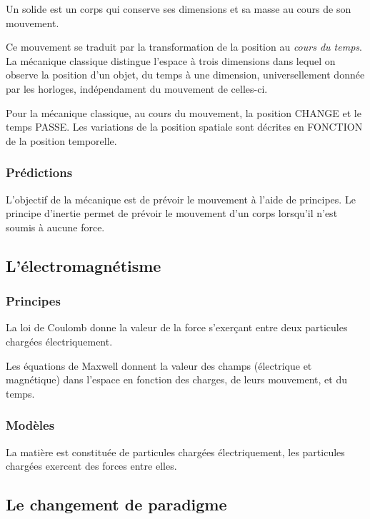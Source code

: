 Un solide est un corps qui conserve ses dimensions et sa masse au cours de son mouvement.

Ce mouvement se traduit par la transformation de la position au {\it cours du temps}. La mécanique classique distingue l'espace à trois dimensions dans lequel on observe la position d'un objet, du temps à une dimension, universellement donnée par les horloges, indépendament du mouvement de celles-ci.

Pour la mécanique classique, au cours du mouvement, la position CHANGE et le temps PASSE. Les variations de la position spatiale sont décrites en FONCTION de la position temporelle.




  \subsubsection{Prédictions}

L'objectif de la mécanique est de prévoir le mouvement à l'aide de principes. Le principe d'inertie permet de prévoir le mouvement d'un corps lorsqu'il n'est soumis à aucune force. 


  \subsection{L'électromagnétisme}

  \subsubsection{Principes}

La loi de Coulomb donne la valeur de la force s'exerçant entre deux particules chargées électriquement.

Les équations de Maxwell donnent la valeur des champs (électrique et magnétique) dans l'espace en fonction des charges, de leurs mouvement, et du temps.

  \subsubsection{Modèles}

La matière est constituée de particules chargées électriquement, les particules chargées exercent des forces entre elles.


  \subsection{Le changement de paradigme}

